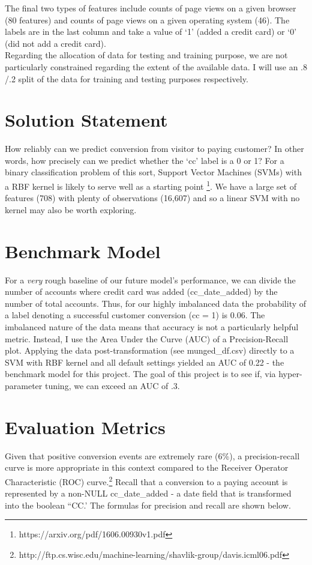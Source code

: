 \documentclass{article} %
\begin{document}
\indent The final two types of features include counts of page views on a given browser (80 features) and counts of page views on a given operating system (46). The labels are in the last column and take a value of `1' (added a credit card) or `0' (did not add a credit card). \\
\indent Regarding the allocation of data for testing and training purpose, we are not particularly constrained regarding the extent of the available data. I will use an .8 /.2 split of the data for training and testing purposes respectively. 
                         
\section{Solution Statement}
\indent\indent How reliably can we predict conversion from visitor to paying customer? In other words, how precisely can we predict whether the `cc' label is a 0 or 1? For a binary classification problem of this sort,  Support Vector Machines (SVMs) with a RBF kernel is likely to serve well as a starting point \footnote{https://arxiv.org/pdf/1606.00930v1.pdf}. We have a large set of features (708) with plenty of observations (16,607) and so a linear SVM with no kernel may also be worth exploring. \\

\section{Benchmark Model}
\indent\indent For a \textit{very} rough baseline of our future model's performance, we can divide the number of accounts where credit card was added (cc\_date\_added) by the number of total accounts. Thus, for our highly imbalanced data the probability of a label denoting a successful customer conversion (cc = 1) is 0.06. The imbalanced nature of the data means that accuracy is not a particularly helpful metric. Instead, I use the Area Under the Curve (AUC) of a Precision-Recall plot. Applying the data post-transformation (see munged\_df.csv) directly to a SVM with RBF kernel and all default settings yielded an AUC of 0.22 - the benchmark model for this project. The goal of this project is to see if, via hyper-parameter tuning, we can exceed an AUC of .3.

\section{Evaluation Metrics}
\indent\indent Given that positive conversion events are extremely rare (6\%), a precision-recall curve is more appropriate in this context compared to the Receiver Operator Characteristic (ROC) curve.\footnote{http://ftp.cs.wisc.edu/machine-learning/shavlik-group/davis.icml06.pdf} Recall that a conversion to a paying account is represented by a non-NULL cc\_date\_added - a date field that is transformed into the boolean ``CC.' The formulas for precision and recall are shown below.
\end{document}
